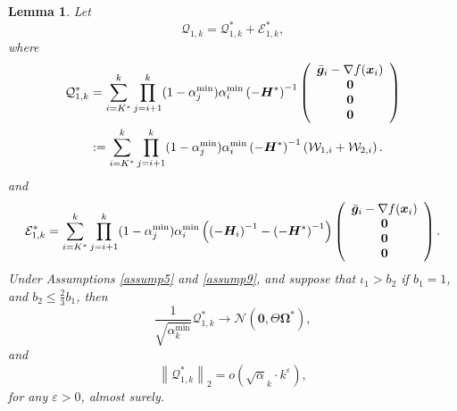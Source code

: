 \documentclass[aos]{imsart}
\numberwithin{equation}{section}
\theoremstyle{plain}
\newtheorem{lemma}{Lemma}
\begin{document}
\begin{appendix}
\begin{lemma}
\label{lemma15}
    Let
    \begin{equation*}
        \mathcal{Q}_{1,k} = \mathcal{Q}_{1,k}^{*} + \mathcal{E}_{1,k}^{*},
    \end{equation*}
    where 
    \begin{equation*}
        \begin{split}
            \mathcal{Q}_{1,k}^{*} & = \sum_{i=K^{*}}^{k} \prod_{j=i+1}^{k} (1-\alpha^{\min}_j) \alpha^{\min}_i \left(-\bm{H}^{*}\right)^{-1} \left( \begin{array}{c}
                \Bar{\bm{g}}_{i} - \nabla f(\bm{x}_i) \\
                \bm{0}\\
                \bm{0}\\
                \bm{0}\\
            \end{array}\right) \\
        & : = \sum_{i=K^{*}}^{k} \prod_{j=i+1}^{k} (1-\alpha^{\min}_j) \alpha^{\min}_i \left(-\bm{H}^{*}\right)^{-1} \left( \mathcal{W}_{1,i} + \mathcal{W}_{2,i} \right).
        \end{split}
    \end{equation*}
    and
    \begin{equation*}
        \mathcal{E}_{1,k}^{*} = \sum_{i=K^{*}}^{k} \prod_{j=i+1}^{k} (1-\alpha^{\min}_j) \alpha^{\min}_i \left(\left(-\bm{H}_{i}\right)^{-1} - \left(-\bm{H}^{*}\right)^{-1}\right) \left( \begin{array}{c}
                \Bar{\bm{g}}_{i} - \nabla f(\bm{x}_i) \\
                \bm{0}\\
                \bm{0}\\
                \bm{0}\\
            \end{array}\right).
    \end{equation*}
    Under Assumptions \ref{assump5} and  \ref{assump9}, and suppose that $\iota_1>b_2$ if $b_1=1$, and $b_2 \leq \frac{2}{3}b_1$,
    then
    \begin{equation}
    \label{eq34}
        \frac{1}{\sqrt{\alpha_k^{\text{min}}}}\mathcal{Q}_{1,k}^{*} \to \mathcal{N}\left( \bm{0}, \Theta \bm{\Omega}^{*} \right),
    \end{equation}
    and
    \begin{equation}
    \label{eq35}
        \left\| \mathcal{Q}_{1,k}^{*}  \right\|_2 = o\left(\sqrt{\alpha}_k \cdot k^{\varepsilon}  \right),
    \end{equation}
    for any $\varepsilon > 0$, almost surely.
    

\end{lemma}
\end{appendix}
\end{document}
